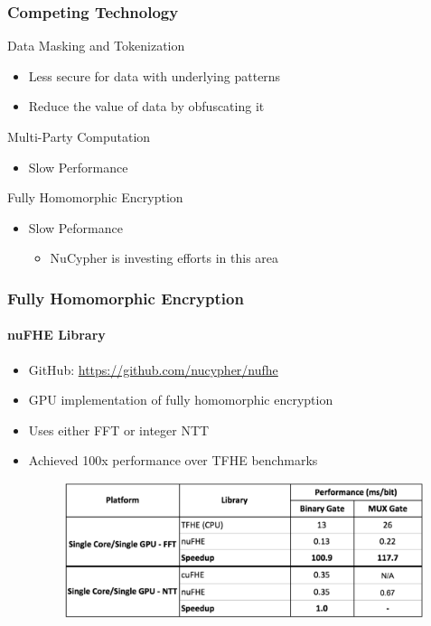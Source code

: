 \documentclass[xetex,mathsans,sans,aspectratio=169]{beamer}
\begin{document}
    \begin{frame}
      \frametitle{Competing Technology}
       Data Masking and Tokenization
       \begin{itemize}
           \item Less secure for data with underlying patterns
           \item Reduce the value of data by obfuscating it
       \end{itemize}

       Multi-Party Computation
       \begin{itemize}
           \item Slow Performance
       \end{itemize}

       Fully Homomorphic Encryption
       \begin{itemize}
           \item Slow Peformance
           \begin{itemize}
               \item NuCypher is investing efforts in this area
           \end{itemize}
       \end{itemize}

     \end{frame}

    \begin{frame}
      \frametitle{Fully Homomorphic Encryption}
       \framesubtitle{nuFHE Library}
       \begin{itemize}
           \item GitHub: \url{https://github.com/nucypher/nufhe}
           \item GPU implementation of fully homomorphic encryption
           \item Uses either FFT or integer NTT
           \item Achieved 100x performance over TFHE benchmarks
           \begin{figure}
               \includegraphics[width=10.5cm]{pdf/nufhe-benchmarks.pdf}
           \end{figure}
       \end{itemize}
     \end{frame}
\end{document}
